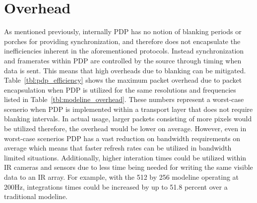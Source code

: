 \section{Overhead}
    As mentioned previously, internally PDP has no notion of blanking periods or porches for providing synchronization, and therefore does not encapsulate the inefficiencies inherent in the aforementioned protocols. Instead synchronization and framerates within PDP are controlled by the source through timing when data is sent. This means that high overheads due to blanking can be mitigated. Table~\ref{tbl:pdp_efficiency} shows the maximum packet overhead due to packet encapsulation when PDP is utilized for the same resolutions and frequencies listed in Table~\ref{tbl:modeline_overhead}. These numbers represent a worst-case scenerio when PDP is implemented within a transport layer that does not require blanking intervals. In actual usage, larger packets consisting of more pixels would be utilized therefore, the overhead would be lower on average. However, even in worst-case scenerios PDP has a vast reduction on bandwidth requirements on average which means that faster refresh rates can be utilized in bandwidth limited situations. Additionally, higher interation times could be utilized within IR cameras and sensors due to less time being needed for writing the same visible data to an IR array. For example, with the 512 by 256 modeline operating at 200Hz, integrations times could be increased by up to 51.8 percent over a traditional modeline.

